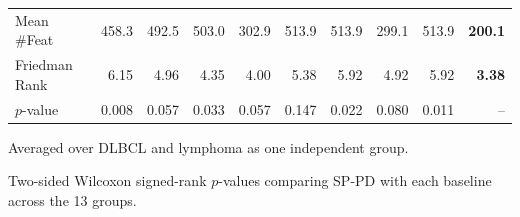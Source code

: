 \begin{table}[!t]
\begin{threeparttable}
\begin{tabular}{@{}lrrrrrrrrr@{}}
Mean \#Feat               & 458.3 & 492.5 & 503.0 & 302.9 & 513.9 & 513.9 & 299.1 & 513.9 & \textbf{200.1} \\
Friedman Rank             & 6.15 & 4.96 & 4.35 & 4.00 & 5.38 & 5.92 & 4.92 & 5.92 & \textbf{3.38} \\
$p$-value\tnote{b}        & 0.008 & 0.057 & 0.033 & 0.057 & 0.147 & 0.022 & 0.080 & 0.011 & -- \\
\bottomrule
\end{tabular}
\begin{tablenotes}[flushleft]
\scriptsize
\item[a] Averaged over DLBCL and lymphoma as one independent group.
\item[b] Two-sided Wilcoxon signed-rank $p$-values comparing SP-PD with each baseline across the 13 groups.
\end{tablenotes}
\end{threeparttable}
\end{table}

